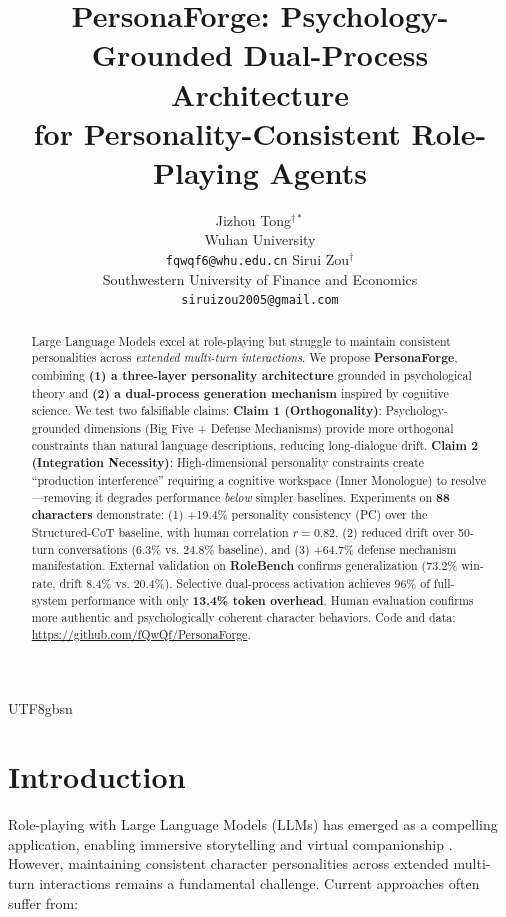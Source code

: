 \documentclass[11pt]{article}
\title{PersonaForge: Psychology-Grounded Dual-Process Architecture \\ for Personality-Consistent Role-Playing Agents}
\author{
  Jizhou Tong$^{\dagger \ast}$ \\
  Wuhan University \\
  \texttt{fqwqf6@whu.edu.cn}
  \And
  Sirui Zou$^{\dagger}$ \\
  Southwestern University of Finance and Economics \\
  \texttt{siruizou2005@gmail.com}
}
\begin{document}
\begin{CJK*}{UTF8}{gbsn}
\maketitle
\begingroup
\renewcommand{\thefootnote}{}
\endgroup

\begin{abstract}
Large Language Models excel at role-playing but struggle to maintain consistent personalities across \textit{extended multi-turn interactions}. We propose \textbf{PersonaForge}, combining \textbf{(1) a three-layer personality architecture} grounded in psychological theory and \textbf{(2) a dual-process generation mechanism} inspired by cognitive science. We test two falsifiable claims: \textbf{Claim 1 (Orthogonality)}: Psychology-grounded dimensions (Big Five + Defense Mechanisms) provide more orthogonal constraints than natural language descriptions, reducing long-dialogue drift. \textbf{Claim 2 (Integration Necessity)}: High-dimensional personality constraints create ``production interference'' requiring a cognitive workspace (Inner Monologue) to resolve---removing it degrades performance \textit{below} simpler baselines. Experiments on \textbf{88 characters} demonstrate: (1) +19.4\% personality consistency (PC) over the Structured-CoT baseline, with human correlation $r=0.82$, (2) reduced drift over 50-turn conversations (6.3\% vs. 24.8\% baseline), and (3) +64.7\% defense mechanism manifestation. External validation on \textbf{RoleBench} confirms generalization (73.2\% win-rate, drift 8.4\% vs. 20.4\%). Selective dual-process activation achieves 96\% of full-system performance with only \textbf{13.4\% token overhead}. Human evaluation confirms more authentic and psychologically coherent character behaviors. Code and data: \url{https://github.com/fQwQf/PersonaForge}.
\end{abstract}

\section{Introduction}

Role-playing with Large Language Models (LLMs) has emerged as a compelling application, enabling immersive storytelling and virtual companionship \citep{chen2024persona}. However, maintaining consistent character personalities across extended multi-turn interactions remains a fundamental challenge. Current approaches often suffer from:


\end{CJK*}
\end{document}
